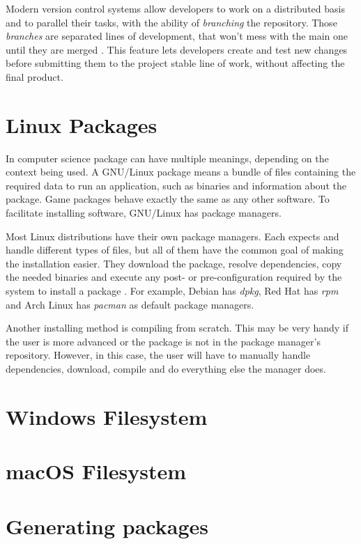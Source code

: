 Modern version control systems allow developers to work on a distributed basis and to parallel their tasks, with the ability of \textit{branching} the repository. Those \textit{branches} are separated lines of development, that won't mess with the main one until they are merged \cite{westby2015git}. This feature lets developers create and test new changes before submitting them to the project stable line of work, without affecting the final product.

\section{Linux Packages}
\label {sec:packages}

In computer science package can have multiple meanings, depending on the context being used. A GNU/Linux package means a bundle of files containing the required data to run an application, such as binaries and information about the package. Game packages behave exactly the same as any other software. To facilitate installing software, GNU/Linux has package managers.

Most Linux distributions have their own package managers. Each expects and handle different types of files, but all of them have the common goal of making the installation easier. They download the package, resolve dependencies, copy the needed binaries and execute any post- or pre-configuration required by the system to install a package \cite{linode2017linux}. For example, Debian has \textit{dpkg}, Red Hat has \textit{rpm} and Arch Linux has \textit{pacman} as default package managers.

Another installing method is compiling from scratch. This may be very handy if the user is more advanced or the package is not in the package manager's repository. However, in this case, the user will have to manually handle dependencies, download, compile and do everything else the manager does.


\section{Windows Filesystem}
\label{sec:win_filesystem}


\section{macOS Filesystem}
\label{sec:win_filesystem}


\section{Generating packages}
\label{sec:win_filesystem}


